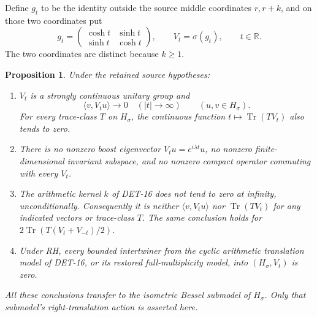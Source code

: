 \documentclass[11pt,a4paper]{article}
\newcommand{\Tr}{\operatorname{Tr}}
\newcommand{\R}{\mathbb R}
\newcommand{\fid}[1]{\textsf{#1}}
\newtheorem*{proposition}{Proposition}
\begin{document}
Define \(g_t\) to be the identity outside the source middle
coordinates \(r,r+k\), and on those two coordinates put
\[
 g_t=\begin{pmatrix}\cosh t&\sinh t\\
                      \sinh t&\cosh t\end{pmatrix},\qquad
 V_t=\sigma(g_t),\qquad t\in\R.
\]
The two coordinates are distinct because \(k\ge1\).

\begin{proposition}
Under the retained source hypotheses:
\begin{enumerate}
\item \(V_t\) is a strongly continuous unitary group and
\[
 \langle v,V_tu\rangle\longrightarrow0
 \quad(|t|\longrightarrow\infty)
 \qquad(u,v\in H_\sigma).
\]
For every trace-class \(T\) on \(H_\sigma\), the continuous
function \(t\mapsto\Tr(TV_t)\) also tends to zero.
\item There is no nonzero boost eigenvector
\(V_tu=e^{i\lambda t}u\), no nonzero finite-dimensional invariant
subspace, and no nonzero compact operator commuting with every
\(V_t\).
\item The arithmetic kernel \(k\) of \fid{DET-16} does not tend
to zero at infinity, unconditionally. Consequently it is neither
\(\langle v,V_tu\rangle\) nor \(\Tr(TV_t)\) for any indicated
vectors or trace-class \(T\). The same conclusion holds for
\(2\Tr(T(V_t+V_{-t})/2)\).
\item Under RH, every bounded intertwiner from the cyclic
arithmetic translation model of \fid{DET-16}, or its restored
full-multiplicity model, into \((H_\sigma,V_t)\) is zero.
\end{enumerate}
All these conclusions transfer to the isometric Bessel submodel
of \(H_\sigma\). Only that submodel's right-translation action
is asserted here.
\end{proposition}
\end{document}
